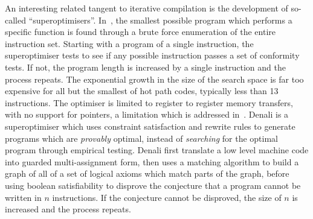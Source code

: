 

%
%



An interesting related tangent to iterative compilation is the
development of so-called ``superoptimisers''. In~\cite{Massalin1987},
the smallest possible program which performs a specific function is
found through a brute force enumeration of the entire instruction
set. Starting with a program of a single instruction, the
superoptimiser tests to see if any possible instruction passes a set
of conformity tests. If not, the program length is increased by a
single instruction and the process repeats. The exponential growth in
the size of the search space is far too expensive for all but the
smallest of hot path codes, typically less than 13 instructions. The
optimiser is limited to register to register memory transfers, with no
support for pointers, a limitation which is addressed
in~\cite{Joshi2002}. Denali is a superoptimiser which uses constraint
satisfaction and rewrite rules to generate programs which are
\emph{provably} optimal, instead of \emph{searching} for the optimal
program through empirical testing. Denali first translate a low level
machine code into guarded multi-assignment form, then uses a matching
algorithm to build a graph of all of a set of logical axioms which
match parts of the graph, before using boolean satisfiability to
disprove the conjecture that a program cannot be written in $n$
instructions. If the conjecture cannot be disproved, the size of $n$
is increased and the process repeats.


